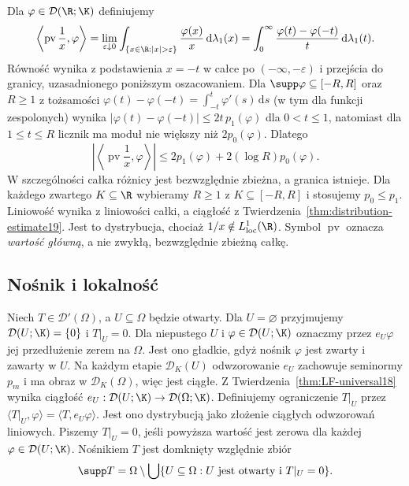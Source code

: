 \begin{przyklad}
\label{ex:principal-value19}
Dla $\varphi\in\mathcal D(\R;\K)$ definiujemy
\[\left\langle\operatorname{pv}\frac1x,\varphi\right\rangle
=\lim_{\varepsilon\downarrow0}
\int_{\{x\in\R:|x|>\varepsilon\}}
\frac{\varphi(x)}{x}\,\mathrm d\lambda_1(x)
=\int_0^\infty\frac{\varphi(t)-\varphi(-t)}{t}\,
\mathrm d\lambda_1(t).\]
Równość wynika z podstawienia $x=-t$ w całce
po $(-\infty,-\varepsilon)$ i przejścia do granicy,
uzasadnionego poniższym oszacowaniem.
Dla $\supp\varphi\subseteq[-R,R]$ oraz $R\ge1$
z tożsamości $\varphi(t)-\varphi(-t)=\int_{-t}^t\varphi'(s)\,\mathrm ds$
(w tym dla funkcji zespolonych) wynika
$|\varphi(t)-\varphi(-t)|\le2t\,p_1(\varphi)$ dla
$0<t\le1$, natomiast dla $1\le t\le R$ licznik
ma moduł nie większy niż $2p_0(\varphi)$. Dlatego
\[\left|\left\langle\operatorname{pv}\frac1x,
\varphi\right\rangle\right|\le
2p_1(\varphi)+2(\log R)p_0(\varphi).\]
W szczególności całka różnicy jest bezwzględnie zbieżna,
a granica istnieje. Dla każdego zwartego $K\subseteq\R$
wybieramy $R\ge1$ z $K\subseteq[-R,R]$ i stosujemy
$p_0\le p_1$. Liniowość wynika z liniowości całki,
a ciągłość z Twierdzenia~\ref{thm:distribution-estimate19}.
Jest to dystrybucja, chociaż $1/x\notin L^1_{\mathrm{loc}}(\R)$.
Symbol $\operatorname{pv}$ oznacza \emph{wartość główną},
a nie zwykłą, bezwzględnie zbieżną całkę.
\end{przyklad}

\subsection{Nośnik i lokalność}

\begin{definicja}
\label{def:distribution-zero19}
Niech $T\in\mathcal D'(\Omega)$, a $U\subseteq\Omega$
będzie otwarty. Dla $U=\varnothing$ przyjmujemy
$\mathcal D(U;\K)=\{0\}$ i $T|_U=0$.
Dla niepustego $U$ i $\varphi\in\mathcal D(U;\K)$ oznaczmy przez
$e_U\varphi$ jej przedłużenie zerem na $\Omega$.
Jest ono gładkie, gdyż nośnik $\varphi$ jest zwarty
i zawarty w $U$. Na każdym etapie $\mathcal D_K(U)$
odwzorowanie $e_U$ zachowuje seminormy $p_m$ i ma obraz
w $\mathcal D_K(\Omega)$, więc jest ciągłe.
Z Twierdzenia~\ref{thm:LF-universal18} wynika ciągłość
$e_U:\mathcal D(U;\K)\to\mathcal D(\Omega;\K)$.
Definiujemy ograniczenie $T|_U$ przez
$\langle T|_U,\varphi\rangle=\langle T,e_U\varphi\rangle$.
Jest ono dystrybucją jako złożenie ciągłych odwzorowań liniowych.
Piszemy $T|_U=0$, jeśli powyższa wartość jest zerowa
dla każdej $\varphi\in\mathcal D(U;\K)$.
Nośnikiem $T$ jest domknięty względnie zbiór
\[\supp T=\Omega\setminus\bigcup\{U\subseteq\Omega:
U\text{ jest otwarty i }T|_U=0\}.\]
\end{definicja}

